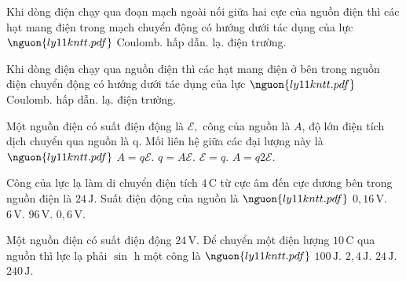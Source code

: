 \begin{ex}
Khi dòng điện chạy qua đoạn mạch ngoài nối giữa hai cực của nguồn điện thì các hạt mang điện trong mạch chuyển động có hướng dưới tác dụng của lực $\nguon{ly11 kntt.pdf}$
\choice
{Coulomb.}
{hấp dẫn.}
{lạ.}
{\True điện trường.}
\end{ex}

\begin{ex}
Khi dòng điện chạy qua nguồn điện thì các hạt mang điện ở bên trong nguồn điện chuyển động có hướng dưới tác dụng của lực $\nguon{ly11 kntt.pdf}$
\choice
{Coulomb.}
{hấp dẫn.}
{\True lạ.}
{điện trường.}
\end{ex}

\begin{ex}
Một nguồn điện có suất điện động là $\mathcal{E},$ công của nguồn là $A$, độ lớn điện tích dịch chuyển qua nguồn là q. Mối liên hệ giữa các đại lượng này là $\nguon{ly11 kntt.pdf}$
\choice
{\True $A = q\mathcal{E}$.}
{$q = A\mathcal{E}$.}
{$\mathcal{E} = q$.}
{$A = q 2 \mathcal{E}$.}
\end{ex}

\begin{ex}
Công của lực lạ làm di chuyển điện tích $4\,\mathrm{C}$ từ cực âm đến cực dương bên trong nguồn điện là $24\,\mathrm{J}$. Suất điện động của nguồn là $\nguon{ly11 kntt.pdf}$
\choice
{$0,16\,\mathrm{V}$.}
{\True $6\,\mathrm{V}$.}
{$96\,\mathrm{V}$.}
{$0,6\,\mathrm{V}$.}
\end{ex}

\begin{ex}
Một nguồn điện có suất điện động $24\,\mathrm{V}$. Để chuyển một điện lượng $10\,\mathrm{C}$ qua nguồn thì lực lạ phải $\sin$ h một công là $\nguon{ly11 kntt.pdf}$
\choice
{$100\,\mathrm{J}$.}
{$2,4\,\mathrm{J}$.}
{$24\,\mathrm{J}$.}
{\True $240\,\mathrm{J}$.}
\end{ex}

